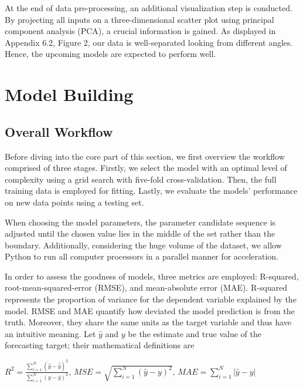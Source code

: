 \documentclass[11pt,a4paper]{article}
\begin{document}
At the end of data pre-processing, an additional visualization step is conducted. By projecting all inputs on a three-dimensional scatter plot using principal component analysis (PCA), a crucial information is gained. As displayed in Appendix 6.2, Figure 2, our data is well-separated looking from different angles. Hence, the upcoming models are expected to perform well.
    \section{Model Building}
    \subsection{Overall Workflow}
Before diving into the core part of this section, we first overview the workflow comprised of three stages. Firstly, we select the model with an optimal level of complexity using a grid search with five-fold cross-validation. Then, the full training data is employed for fitting. Lastly, we evaluate the models' performance on new data points using a testing set.

When choosing the model parameters, the parameter candidate sequence is adjusted until the chosen value lies in the middle of the set rather than the boundary. Additionally, considering the huge volume of the dataset, we allow Python to run all computer processors in a parallel manner for acceleration.

In order to assess the goodness of models, three metrics are employed: R-squared, root-mean-squared-error (RMSE), and mean-absolute error (MAE). R-squared represents the proportion of variance for the dependent variable explained by the model. RMSE and MAE quantify how deviated the model prediction is from the truth. Moreover, they share the same units as the target variable and thus have an intuitive meaning. Let $\hat{y}$ and $y$ be the estimate and true value of the forecasting target; their mathematical definitions are  \\
\centerline{$R^2=\frac{\sum_{i=1}^N (\hat{y}-\bar{\hat{y}})^2}{\sum_{i=1}^N(y-\bar{y})^2}$, $MSE=\sqrt{\sum_{i=1}^N (\hat{y}-y)^2}$, $MAE=\sum_{i=1}^N |\hat{y}-y|$}
\end{document}
